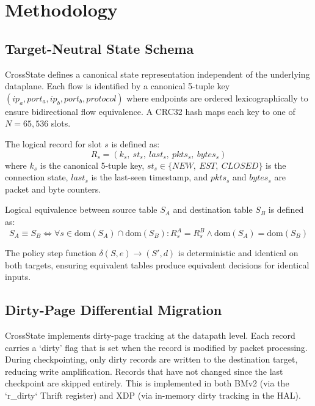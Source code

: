 \documentclass[10pt, conference]{IEEEtran}
\begin{document}
\section{Methodology}
\label{sec:methodology}

\subsection{Target-Neutral State Schema}
CrossState defines a canonical state representation independent of the underlying dataplane. Each flow is identified by a canonical 5-tuple key $(ip_a, port_a, ip_b, port_b, protocol)$ where endpoints are ordered lexicographically to ensure bidirectional flow equivalence. A CRC32 hash maps each key to one of $N = 65{,}536$ slots.

The logical record for slot $s$ is defined as:
\begin{equation}
    R_s = (k_s,\ st_s,\ last_s,\ pkts_s,\ bytes_s)
\label{eq:record}
\end{equation}
where $k_s$ is the canonical 5-tuple key, $st_s \in \{NEW,\ EST,\ CLOSED\}$ is the connection state, $last_s$ is the last-seen timestamp, and $pkts_s$ and $bytes_s$ are packet and byte counters.

Logical equivalence between source table $S_A$ and destination table $S_B$ is defined as:
\begin{equation}
    S_A \equiv S_B \iff \forall s \in \text{dom}(S_A) \cap \text{dom}(S_B):
    R_s^A = R_s^B \land \text{dom}(S_A) = \text{dom}(S_B)
\label{eq:equivalence}
\end{equation}

The policy step function $\delta(S,e)\rightarrow(S',d)$ is deterministic and identical on both targets, ensuring equivalent tables produce equivalent decisions for identical inputs.

\subsection{Dirty-Page Differential Migration}
\label{subsec:dirty_page}
CrossState implements dirty-page tracking at the datapath level. Each record carries a `dirty' flag that is set when the record is modified by packet processing. During checkpointing, only dirty records are written to the destination target, reducing write amplification. Records that have not changed since the last checkpoint are skipped entirely. This is implemented in both BMv2 (via the `r_dirty` Thrift register) and XDP (via in-memory dirty tracking in the HAL).
\end{document}

